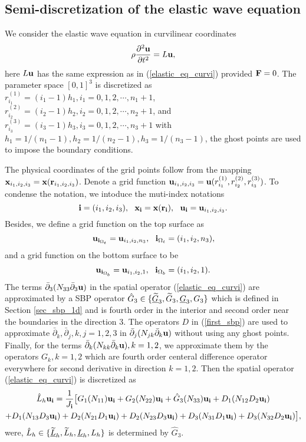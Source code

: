\subsection{Semi-discretization of the elastic wave equation}

We consider the elastic wave equation in curvilinear coordinates 
\begin{equation}\label{elastic_equation}
\rho\frac{\partial^2 {\bf u}}{\partial t^2} = L{\bf u},
\end{equation}
here $L{\bf u}$ has the same expression as in (\ref{elastic_eq_curvi}) provided ${\bf F} = 0$. The parameter space $[0,1]^3$ is discretized as $r_{i_1}^{(1)} = (i_1-1)h_1, i_1 = 0,1,2,\cdots,n_1+1$, $r_{i_2}^{(2)} = (i_2-1)h_2, i_2 = 0,1,2,\cdots,n_2+1$, and $r_{i_3}^{(3)} = (i_3-1)h_3, i_3 = 0,1,2,\cdots,n_3+1$ with $h_1 = 1/(n_1-1), h_2 = 1/(n_2-1), h_3 = 1/(n_3-1)$, the ghost points are used to impose the boundary conditions.

The physical coordinates of the grid points follow from the mapping ${\bf x}_{i_1,i_2,i_3} = {\bf x}({\bf r}_{i_1,i_2,i_3})$. Denote a grid function ${\bf u}_{i_1,i_2,i_3} = {\bf u}(r_{i_1}^{(1)},r_{i_2}^{(2)},r_{i_3}^{(3)})$. To condense the notation, we intoduce the muti-index notations
\[{\bf i} = (i_1,i_2,i_3),\ \ {\bf x}_{\bf i} = {\bf x}({\bf r}_{\bf i}),\ \ {\bf u}_{\bf i} = {\bf u}_{i_1,i_2,i_3}.\]
Besides, we define a grid function on the top surface as
\[{\bf u}_{{\bf i}_{\Omega_t}} = {\bf u}_{i_1,i_2,n_3}, \ \ {\bf i}_{\Omega_t} = (i_1,i_2,n_3),\]
and a grid function on the bottom surface to be
\[{\bf u}_{{\bf i}_{\Omega_b}} = {\bf u}_{i_1,i_2,1}, \ \ {\bf i}_{\Omega_b} = (i_1,i_2,1).\]
{\color{blue}The terms $\bar{\partial}_3(N_{33}\bar{\partial}_3{\bf u})$ in the spatial operator (\ref{elastic_eq_curvi}) are approximated by a SBP operator $\hat{G}_3\in\{\uline{\wt G}_3, \wt{G}_3, \uline{G}_3, G_3\}$ which is defined in Section \ref{sec_sbp_1d} and is fourth order in the interior and  second order near the boundaries in the direction $3$. The operators $D$ in  (\ref{first_sbp}) are used to approximate  $\bar{\partial}_k, \bar{\partial}_j, k,j = 1,2,3$ in $\bar{\partial}_j(N_{jk}\bar{\partial}_k{\bf u})$ without using any ghost points. Finally, for the terms $\bar{\partial}_k(N_{kk}\bar{\partial}_k{\bf u}), k = 1,2$, we approximate them by the operators $G_k, k = 1,2$ which are fourth order centeral difference operator everywhere for second derivative in direction $k = 1,2$. Then the spatial operator (\ref{elastic_eq_curvi}) is discretized as} 
\begin{multline}\label{discrete_elastic}
\hat{ L}_h{\bf u}_{\bf i} = \frac{1}{J_{\bf i}}\big[G_1(N_{11}){\bf u}_{\bf i}+G_2(N_{22}){\bf u}_{\bf i}+\hat{G}_3(N_{33}){\bf u}_{\bf i}+D_1(N_{12}D_2{\bf u}_{\bf i})\\
+D_1(N_{13}D_3{\bf u}_{\bf i})+D_2(N_{21}D_1{\bf u}_{\bf i})+D_2(N_{23}D_3{\bf u}_{\bf i})+D_3(N_{31}D_1{\bf u}_{\bf i})
+D_3(N_{32}D_2{\bf u}_{\bf i})\big],
\end{multline}
{\color{blue} were, $\hat{L}_h\in\{\uline{\wt L}_h, \wt{L}_h, \uline{L}_h,L_h\}$ is determined by $\hat{G}_3$.}